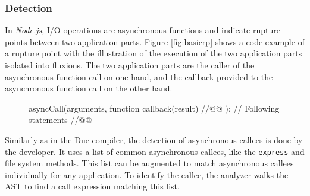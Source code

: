 

\subsubsection{Detection}

In \textit{Node.js}, I/O operations are asynchronous functions and indicate rupture points between two application parts.
Figure \ref{fig:basicrp} shows a code example of a rupture point with the illustration of the execution of the two application parts isolated into fluxions.
The two application parts are the caller of the asynchronous function call on one hand, and the callback provided to the asynchronous function call on the other hand.

\begin{figure}[h!]%
  \bigfig{~}
  \vspace{-2.6\baselineskip}
  \begin{code}
asyncCall(arguments, function callback(result){ //@@ });
// Following statements //@@
  \end{code}%
\end{figure}

Similarly as in the Due compiler, the detection of asynchronous callees is done by the developer. 
It uses a list of common asynchronous callees, like the \texttt{express} and file system methods.
This list can be augmented to match asynchronous callees individually for any application.
To identify the callee, the analyzer walks the AST to find a call expression matching this list.

